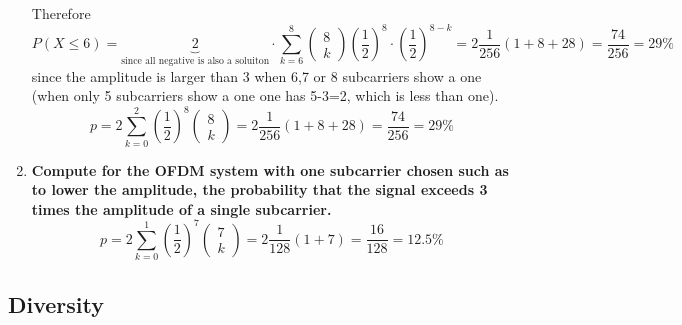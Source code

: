 \begin{enumerate}
Therefore
$$
P(X\leq6)=\underbrace{2}_{\text{since all negative is also a soluiton}} \cdot\sum_{k=6}^8\left(\begin{array}{l}
8 \\
k
\end{array}\right)\left(\frac{1}{2}\right)^8\cdot\left(\frac{1}{2}\right)^{8-k}=2 \frac{1}{256}(1+8+28)=\frac{74}{256}=29 \%
$$
since the amplitude is larger than 3 when 6,7 or 8 subcarriers show a one (when only 5 subcarriers show a one one has 5-3=2, which is less than one).
$$
p=2 \sum_{k=0}^2\left(\frac{1}{2}\right)^8\left(\begin{array}{l}
8 \\
k
\end{array}\right)=2 \frac{1}{256}(1+8+28)=\frac{74}{256}=29 \%
$$
\item \textbf{Compute for the OFDM system with one subcarrier chosen such as to lower the amplitude, the probability
that the signal exceeds 3 times the amplitude of a single subcarrier.}
$$
p=2 \sum_{k=0}^1\left(\frac{1}{2}\right)^7\left(\begin{array}{l}
7 \\
k
\end{array}\right)=2 \frac{1}{128}(1+7)=\frac{16}{128}=12.5 \%
$$
\end{enumerate}
\subsection{Diversity}